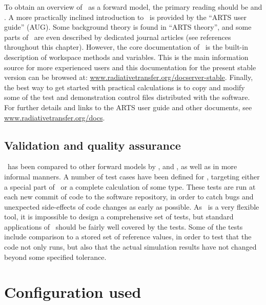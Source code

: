 To obtain an overview of \ARTS\ as a forward model, the primary reading should
be \citet{buehler:artst:05} and \citet{eriksson:arts2:11}. A more practically
inclined introduction to \ARTS\ is provided by the ``ARTS user guide'' (AUG).
Some background theory is found in ``ARTS theory'', and some parts of \ARTS\
are even described by dedicated journal articles (see references throughout
this chapter). However, the core documentation of \ARTS\ is the built-in
description of workspace methods and variables. This is the main information
source for more experienced users and this documentation for the present stable
version can be browsed at: \url{www.radiativetransfer.org/docserver-stable}.
Finally, the best way to get started with practical calculations is to copy and
modify some of the test and demonstration control files distributed with the
software. For further details and links to the ARTS user guide and other
documents, see \url{www.radiativetransfer.org/docs}.



\subsection{Validation and quality assurance}
%
\ARTS\ has been compared to other forward models by
\citet{melsheimer:inter:05}, \citet{buehler2006radiative} and
\citet{saunders07:_atmos_infrar_sound_airs_jgr}, as well as in more informal
manners. A number of test cases have been defined for \ARTS, targeting either a
special part of \ARTS\ or a complete calculation of some type. These tests are
run at each new commit of code to the software repository, in order to catch
bugs and unexpected side-effects of code changes as early as possible. As
\ARTS\ is a very flexible tool, it is impossible to design a comprehensive set
of tests, but standard applications of \ARTS\ should be fairly well covered by
the tests. Some of the tests include comparison to a stored set of reference
values, in order to test that the code not only runs, but also that the actual
simulation results have not changed beyond some specified tolerance.


\section{Configuration used}
\label{sec:arts:config}

